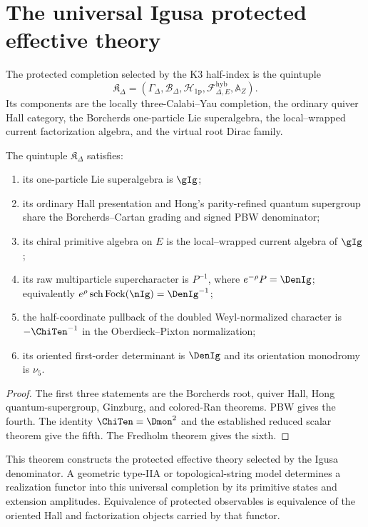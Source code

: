 \chapter{The universal Igusa protected effective theory}
\begin{definition}
The protected completion selected by the K3 half-index is the quintuple
\[
 \mathfrak K_{\Delta}=
 \left(
 \Gamma_\Delta,
 \mathcal B_\Delta,
 \mathcal H_{\mathrm{1p}},
 \mathcal F^{\mathrm{hyb}}_{\Delta,E},
 \mathbb A_Z
 \right).
\]
Its components are the locally three-Calabi--Yau completion, the ordinary quiver Hall category, the Borcherds one-particle Lie superalgebra, the local--wrapped current factorization algebra, and the virtual root Dirac family.
\end{definition}

\begin{theorem}
The quintuple $\mathfrak K_\Delta$ satisfies:
\begin{enumerate}
\item its one-particle Lie superalgebra is $\gIg$;
\item its ordinary Hall presentation and Hong's parity-refined quantum supergroup share the Borcherds--Cartan grading and signed PBW denominator;
\item its chiral primitive algebra on $E$ is the local--wrapped current algebra of $\gIg$;
\item its raw multiparticle supercharacter is $P^{-1}$, where $e^{-\rho}P=\DenIg$; equivalently $e^{\rho}\sch\Fock(\nIg)=\DenIg^{-1}$;
\item the half-coordinate pullback of the doubled Weyl-normalized character is $-\ChiTen^{-1}$ in the Oberdieck--Pixton normalization;
\item its oriented first-order determinant is $\DenIg$ and its orientation monodromy is $\nu_5$.
\end{enumerate}
\end{theorem}
\begin{proof}
The first three statements are the Borcherds root, quiver Hall, Hong quantum-supergroup, Ginzburg, and colored-Ran theorems.  PBW gives the fourth.  The identity $\ChiTen=\Dmon^2$ and the established reduced scalar theorem give the fifth.  The Fredholm theorem gives the sixth.
\end{proof}

This theorem constructs the protected effective theory selected by the Igusa denominator.  A geometric type-IIA or topological-string model determines a realization functor into this universal completion by its primitive states and extension amplitudes.  Equivalence of protected observables is equivalence of the oriented Hall and factorization objects carried by that functor.

